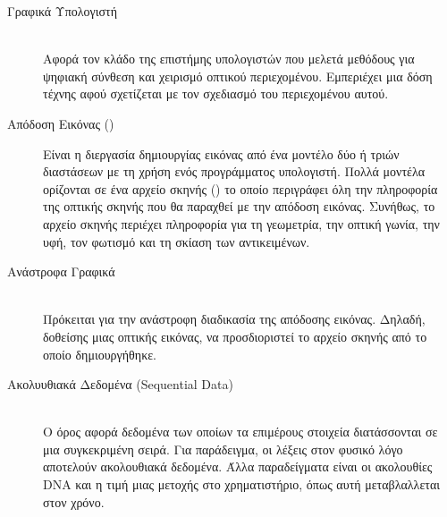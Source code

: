 \begin{description}
    \item[Γραφικά Υπολογιστή] \hfill \\ Αφορά τον κλάδο της επιστήμης υπολογιστών που μελετά μεθόδους για ψηφιακή σύνθεση και χειρισμό οπτικού περιεχομένου. Εμπεριέχει μια δόση τέχνης αφού σχετίζεται με τον σχεδιασμό του περιεχομένου αυτού.
    
    \item[Απόδοση Εικόνας ()] Είναι η διεργασία δημιουργίας εικόνας από ένα μοντέλο δύο ή τριών διαστάσεων με τη χρήση ενός προγράμματος υπολογιστή. Πολλά μοντέλα ορίζονται σε ένα αρχείο σκηνής () το οποίο περιγράφει όλη την πληροφορία της οπτικής σκηνής που θα παραχθεί με την απόδοση εικόνας. Συνήθως, το αρχείο σκηνής περιέχει πληροφορία για τη γεωμετρία, την οπτική γωνία, την υφή, τον φωτισμό και τη σκίαση των αντικειμένων.
    
    \item[Ανάστροφα Γραφικά] \hfill \\ Πρόκειται για την ανάστροφη διαδικασία της απόδοσης εικόνας. Δηλαδή, δοθείσης μιας οπτικής εικόνας, να προσδιοριστεί το αρχείο σκηνής από το οποίο δημιουργήθηκε.
    
    \item[Ακολυυθιακά Δεδομένα (Sequential Data)] \hfill \\ Ο όρος αφορά δεδομένα των οποίων τα επιμέρους στοιχεία διατάσσονται σε μια συγκεκριμένη σειρά. Για παράδειγμα, οι λέξεις στον φυσικό λόγο αποτελούν ακολουθιακά δεδομένα. Άλλα παραδείγματα είναι οι ακολουθίες DNA και η τιμή μιας μετοχής στο χρηματιστήριο, όπως αυτή μεταβλαλλεται στον χρόνο.
 \end{description}